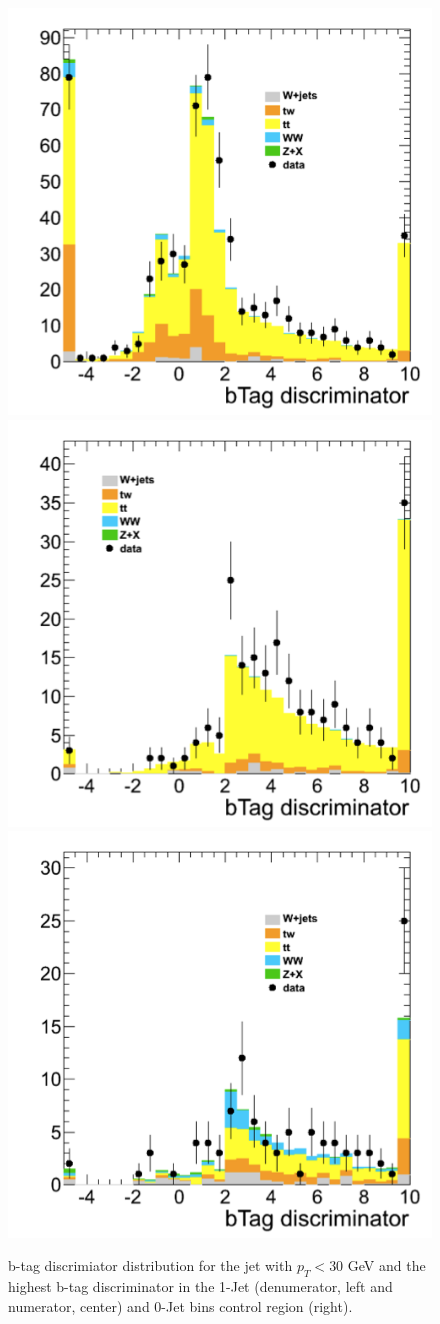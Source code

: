\begin{figure}[hbt]
\begin{center}
\includegraphics[width=0.3\linewidth]{figures/jetLowBtag_denum_dr.png} 
\includegraphics[width=0.3\linewidth]{figures/jetLowBtag_num_dr.png}
\includegraphics[width=0.3\linewidth]{figures/jetLowBtag_topTag_dr.png}
\caption{\label{fig:jetLowBtag}\protect b-tag discrimiator distribution for 
the jet with $p_T<30$ GeV and the highest b-tag discriminator in the
1-Jet (denumerator, left and numerator, center) and 0-Jet bins control
region (right).}
\end{center}
\end{figure}
